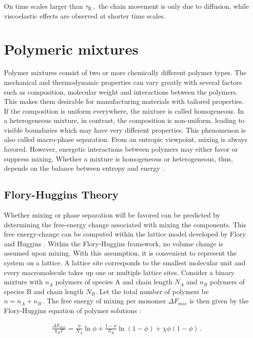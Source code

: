\documentclass[bachelor,       %
               twoside,        %
               BCOR10mm,       %
               ngerman, english %
               ]{GAUBM}
\begin{document}
On time scales larger than $\tau_\mathrm R\,,$ the chain movement is only due to diffusion, while viscoelastic effects are observed at shorter time scales. 
 
 
\section{Polymeric mixtures}
Polymer mixtures consist of two or more chemically different polymer types. The mechanical and thermodynamic properties can vary greatly with several factors such as composition, molecular weight and interactions between the polymers. This makes them desirable for manufacturing materials with tailored properties.\\
If the composition is uniform everywhere, the mixture is called homogeneous. In a heterogeneous mixture, in contrast, the composition is non-uniform, leading to visible boundaries which may have very different properties. This phenomenon is also called macro-phase separation. From an entropic viewpoint, mixing is always favored. However, energetic interactions between polymers may either favor or suppress mixing. Whether a mixture is homogeneous or heterogeneous, thus,  depends on the balance between entropy and energy \cite[S. 137]{Rubin03}.           

\subsection{Flory-Huggins Theory}

Whether mixing or phase separation will be favored can be predicted by determining the free-energy change associated with mixing the components. This free energy-change can be computed within the lattice model developed by Flory and Huggins \cite{Flory42}. Within the Flory-Huggins framework, no volume change is assumed upon mixing. With this assumption, it is convenient to represent the system on a lattice. A lattice site corresponds to the smallest molecular unit and every macromolecule takes up one or multiple lattice sites. Consider a binary mixture with $n_A$ polymers of species A and chain length $N_A$ and $n_B$ polymers of species B and chain length $N_B$. Let the total number of polymers be $n=n_A+n_B\,.$ The free energy of mixing per monomer $\Delta F_{mix}$ is then given by the Flory-Huggins equation of polymer solutions \cite[S. 143]{Rubin03}:

\begin{align}
  \frac{\Delta F_{mix}}{k_BT}=\frac{\phi}{N_A}\ln\phi+\frac{1-\phi}{N_B}\ln(1-\phi)+\chi\phi(1-\phi)\,.
  \label{eq:floryhuggins}
\end{align}
\end{document}
